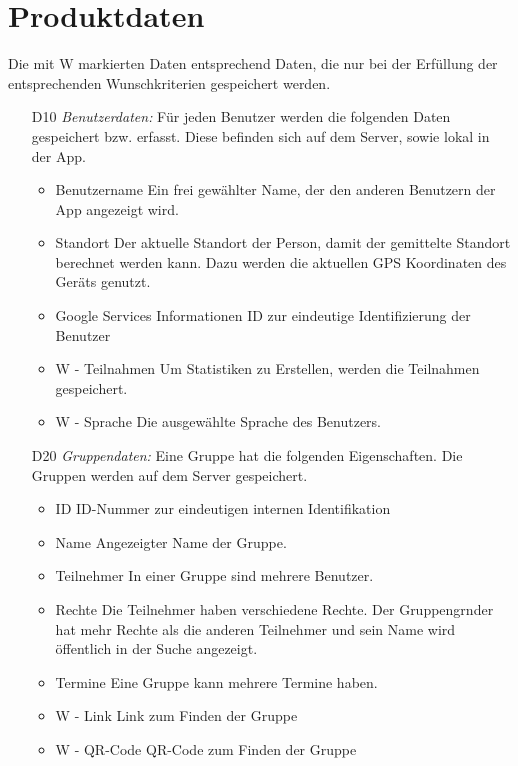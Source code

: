 \documentclass{scrartcl}
\begin{document}
	
	\newpage
	
	
	\section{Produktdaten}
	Die mit W markierten Daten entsprechend Daten, die nur bei der Erfüllung der entsprechenden Wunschkriterien gespeichert werden.
	\begin{itemize}
		\item [D10] \textit{Benutzerdaten:}
		Für jeden Benutzer werden die folgenden Daten gespeichert bzw. erfasst. Diese befinden sich auf dem Server, sowie lokal in der App.
		\begin{itemize}
			\item Benutzername
			\newline Ein frei gewählter Name, der den anderen Benutzern der App angezeigt wird.
			\item Standort
			\newline Der aktuelle Standort der Person, damit der gemittelte Standort berechnet werden kann. Dazu werden die aktuellen GPS Koordinaten des Geräts genutzt.
			\item \gls{Google Services} Informationen
			\newline ID zur eindeutige Identifizierung der Benutzer
			\item W - Teilnahmen
			\newline Um Statistiken zu Erstellen, werden die Teilnahmen gespeichert.
			\item W - Sprache
			\newline Die ausgewählte Sprache des Benutzers.
			
		\end{itemize}
		
		\item [D20] \textit{Gruppendaten:}
		Eine Gruppe hat die folgenden Eigenschaften.
		Die Gruppen werden auf dem Server gespeichert.
		\begin{itemize}
			\item ID
			\newline ID-Nummer zur eindeutigen internen Identifikation
			\item Name
			\newline Angezeigter Name der Gruppe.
			\item \gls{Teilnehmer}
			\newline In einer Gruppe sind mehrere Benutzer.
			\item Rechte
			\newline Die \gls{Teilnehmer} haben verschiedene Rechte. Der \gls{Gruppengrnder} hat mehr Rechte als die anderen Teilnehmer und sein Name wird öffentlich in der Suche angezeigt.
			\item Termine
			\newline Eine Gruppe kann mehrere Termine haben.
			\item W - Link
			\newline Link zum Finden der Gruppe
			\item W - QR-Code
			\newline QR-Code zum Finden der Gruppe
		\end{itemize}
		

\end{itemize}
\end{document}
